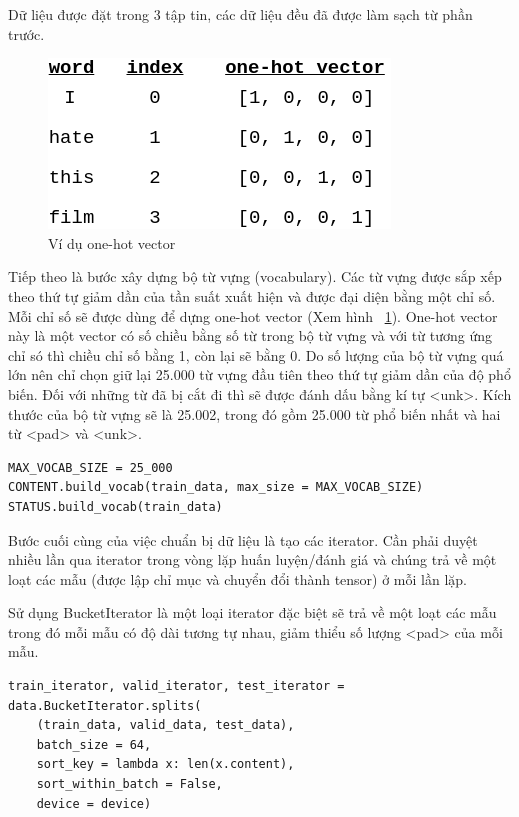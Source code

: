 \documentclass[runningheads]{llncs}
\begin{document}
Dữ liệu được đặt trong 3 tập tin, các dữ liệu đều đã được làm sạch từ phần trước.

\begin{figure}
\includegraphics[scale=0.5]{sentiment5.png}
\centering
\caption{Ví dụ one-hot vector \label{figOnehotVector}}
\end{figure}

Tiếp theo là bước xây dựng bộ từ vựng (vocabulary). Các từ vựng được sắp xếp theo thứ tự giảm dần của tần suất xuất hiện và được đại diện bằng một chỉ số. Mỗi chỉ số sẽ được dùng để dựng one-hot vector (Xem hình ~\ref{figOnehotVector}). One-hot vector này là một vector có số chiều bằng số từ trong bộ từ vựng và với từ tương ứng chỉ só thì chiều chỉ số bằng 1, còn lại sẽ bằng 0. Do số lượng của bộ từ vựng quá lớn nên chỉ chọn giữ lại 25.000 từ vựng đầu tiên theo thứ tự giảm dần của độ phổ biến. Đối với những từ đã bị cắt đi thì sẽ được đánh dấu bằng kí tự <unk>. Kích thước của bộ từ vựng sẽ là 25.002, trong đó gồm 25.000 từ phổ biến nhất và hai từ <pad> và <unk>.

\begin{lstlisting}
MAX_VOCAB_SIZE = 25_000
CONTENT.build_vocab(train_data, max_size = MAX_VOCAB_SIZE)
STATUS.build_vocab(train_data)
\end{lstlisting}

Bước cuối cùng của việc chuẩn bị dữ liệu là tạo các iterator. Cần phải duyệt nhiều lần qua iterator trong vòng lặp huấn luyện/đánh giá và chúng trả về một loạt các mẫu (được lập chỉ mục và chuyển đổi thành tensor) ở mỗi lần lặp.

Sử dụng BucketIterator là một loại iterator đặc biệt sẽ trả về một loạt các mẫu trong đó mỗi mẫu có độ dài tương tự nhau, giảm thiểu số lượng <pad> của mỗi mẫu.

\begin{lstlisting}
train_iterator, valid_iterator, test_iterator = data.BucketIterator.splits(
    (train_data, valid_data, test_data), 
    batch_size = 64,
    sort_key = lambda x: len(x.content),
    sort_within_batch = False,
    device = device)
\end{lstlisting}
\end{document}

